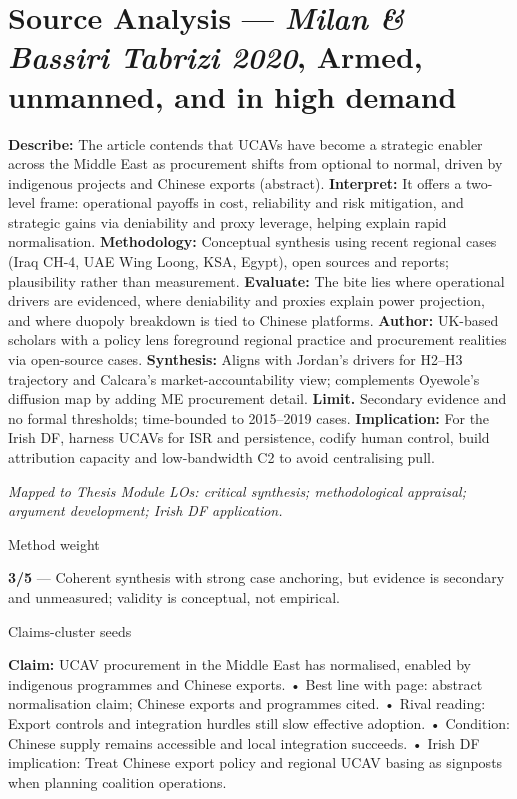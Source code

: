 \section*{Source Analysis — \textit{Milan & Bassiri Tabrizi 2020}, Armed, unmanned, and in high demand}
\textbf{Describe:} The article contends that UCAVs have become a strategic enabler across the Middle East as procurement shifts from optional to normal, driven by indigenous projects and Chinese exports (abstract).
\textbf{Interpret:} It offers a two-level frame: operational payoffs in cost, reliability and risk mitigation, and strategic gains via deniability and proxy leverage, helping explain rapid normalisation.
\textbf{Methodology:} Conceptual synthesis using recent regional cases (Iraq CH-4, UAE Wing Loong, KSA, Egypt), open sources and reports; plausibility rather than measurement.
\textbf{Evaluate:} The bite lies where operational drivers are evidenced, where deniability and proxies explain power projection, and where duopoly breakdown is tied to Chinese platforms.
\textbf{Author:} UK-based scholars with a policy lens foreground regional practice and procurement realities via open-source cases.
\textbf{Synthesis:} Aligns with Jordan’s drivers for H2–H3 trajectory and Calcara’s market-accountability view; complements Oyewole’s diffusion map by adding ME procurement detail.
\textbf{Limit.} Secondary evidence and no formal thresholds; time-bounded to 2015–2019 cases. \textbf{Implication:} For the Irish DF, harness UCAVs for ISR and persistence, codify human control, build attribution capacity and low-bandwidth C2 to avoid centralising pull.

\textit{Mapped to Thesis Module LOs: critical synthesis; methodological appraisal; argument development; Irish DF application.}

Method weight

\textbf{3/5} — Coherent synthesis with strong case anchoring, but evidence is secondary and unmeasured; validity is conceptual, not empirical.

Claims-cluster seeds

\textbf{Claim:} UCAV procurement in the Middle East has normalised, enabled by indigenous programmes and Chinese exports.
• Best line with page: abstract normalisation claim; Chinese exports and programmes cited.
• Rival reading: Export controls and integration hurdles still slow effective adoption.
• Condition: Chinese supply remains accessible and local integration succeeds.
• Irish DF implication: Treat Chinese export policy and regional UCAV basing as signposts when planning coalition operations.

